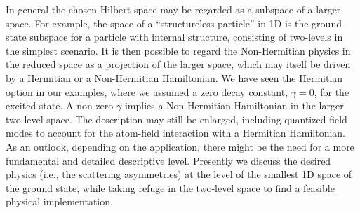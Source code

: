 In general the chosen Hilbert space may  be regarded as a subspace of a larger space. For example,  the space of a ``structureless particle'' in 1D is the ground-state subspace
for a particle with internal structure, consisting of two-levels in the simplest scenario.
It is then possible to regard the Non-Hermitian physics in the reduced space
as a projection of the larger space, which may itself be driven by a  Hermitian or a Non-Hermitian Hamiltonian.
We have seen the Hermitian option in our examples, where we assumed a zero decay constant, $\gamma=0$, for the excited state.
A non-zero $\gamma$ implies  a Non-Hermitian  Hamiltonian in the larger two-level space. The description may still be
enlarged,  including  quantized field modes to account for the atom-field interaction with a Hermitian Hamiltonian.
As an outlook, depending on the application, there might be the need for a more fundamental and detailed descriptive level. Presently we discuss the desired physics (i.e., the scattering asymmetries) at the level of the smallest 1D space of the ground state, while taking refuge in the
two-level space to find a feasible physical implementation.
